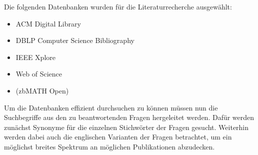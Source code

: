 Die folgenden Datenbanken wurden für die Literaturrecherche ausgewählt:

\begin{itemize}
    \item ACM Digital Library
    \item DBLP Computer Science Bibliography
    \item IEEE Xplore
    \item Web of Science
    \item (zbMATH Open)
\end{itemize}

Um die Datenbanken effizient durchsuchen zu können müssen nun die Suchbegriffe aus den zu beantwortenden Fragen hergeleitet werden. Dafür werden zunächst Synonyme für die einzelnen Stichwörter der Fragen gesucht. Weiterhin werden dabei auch die englischen Varianten der Fragen betrachtet, um ein möglichst breites Spektrum an möglichen Publikationen abzudecken.


